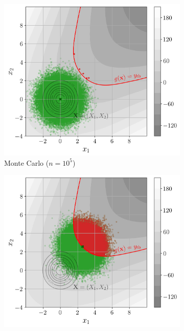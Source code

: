 


\begin{figure}[ht]
    \centering
    \begin{subfigure}[b]{0.32\textwidth}
        \centering
        \includegraphics[width=\textwidth]{../numerical_experiments/chapter1/figures/reliability_MC_illustration.png}
        \caption{Monte Carlo ($n=10^5$)}
    \end{subfigure}
    \hfill
    \begin{subfigure}[b]{0.32\textwidth}
        \centering
        \includegraphics[width=\textwidth]{../numerical_experiments/chapter1/figures/reliability_IS_illustration.png}

\end{subfigure}
\end{figure}
